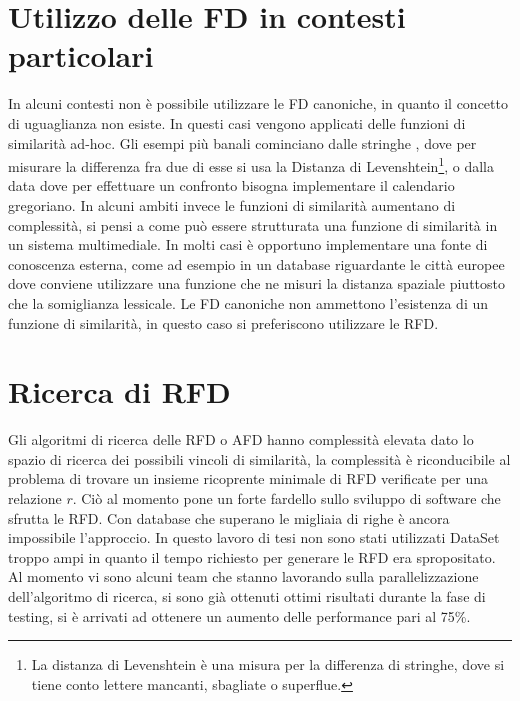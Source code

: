 \section{Utilizzo delle FD in contesti particolari}

In alcuni contesti non è possibile utilizzare le FD canoniche, in quanto il concetto di uguaglianza non esiste. In questi casi vengono applicati delle funzioni di similarità ad-hoc. Gli esempi più banali cominciano dalle stringhe , dove per misurare la differenza fra due di esse si usa la Distanza di Levenshtein\footnote{La distanza di Levenshtein è una misura per la differenza di stringhe, dove si tiene conto lettere mancanti, sbagliate o superflue.}, o dalla data  dove per effettuare un confronto bisogna implementare il calendario gregoriano. In alcuni ambiti invece le funzioni di similarità aumentano di complessità, si pensi a come può essere strutturata una funzione di similarità in un sistema multimediale. In molti casi è opportuno implementare una fonte di conoscenza esterna, come ad esempio in un database riguardante le città europee dove conviene utilizzare una funzione che ne misuri la distanza spaziale piuttosto che la somiglianza lessicale. Le FD canoniche non ammettono l'esistenza di un funzione di similarità, in questo caso si preferiscono utilizzare le RFD.

\section{Ricerca di RFD}
Gli algoritmi di ricerca delle RFD o AFD hanno complessità elevata dato lo spazio di ricerca dei possibili vincoli di similarità, la complessità è riconducibile al problema di trovare un insieme ricoprente minimale di RFD verificate per una relazione $r$. Ciò al momento pone un forte fardello sullo sviluppo di software che sfrutta le RFD. Con database che superano le migliaia di righe è ancora impossibile l’approccio. In questo lavoro di tesi non sono stati utilizzati DataSet troppo ampi in quanto il tempo richiesto per generare le RFD era spropositato. Al momento vi sono alcuni team che stanno lavorando sulla parallelizzazione dell'algoritmo di ricerca, si sono già ottenuti ottimi risultati durante la fase di testing, si è arrivati ad ottenere un aumento delle performance pari al 75\%.


